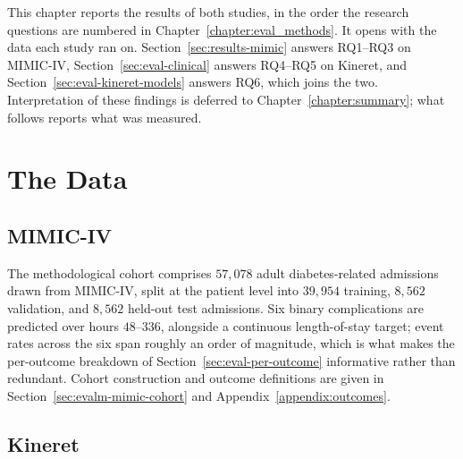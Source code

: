 This chapter reports the results of both studies, in the order the research
questions are numbered in Chapter~\ref{chapter:eval_methods}. It opens with the
data each study ran on. Section~\ref{sec:results-mimic} answers RQ1--RQ3 on
MIMIC-IV, Section~\ref{sec:eval-clinical} answers RQ4--RQ5 on Kineret, and
Section~\ref{sec:eval-kineret-models} answers RQ6, which joins the two.
Interpretation of these findings is deferred to
Chapter~\ref{chapter:summary}; what follows reports what was measured.

\section{The Data}
\label{sec:results-data}

\subsection{MIMIC-IV}

The methodological cohort comprises $57{,}078$ adult diabetes-related
admissions drawn from MIMIC-IV, split at the patient level into $39{,}954$
training, $8{,}562$ validation, and $8{,}562$ held-out test admissions. Six
binary complications are predicted over hours $48$--$336$, alongside a
continuous length-of-stay target; event rates across the six span roughly an
order of magnitude, which is what makes the per-outcome breakdown of
Section~\ref{sec:eval-per-outcome} informative rather than redundant. Cohort
construction and outcome definitions are given in
Section~\ref{sec:evalm-mimic-cohort} and Appendix~\ref{appendix:outcomes}.

\subsection{Kineret}

